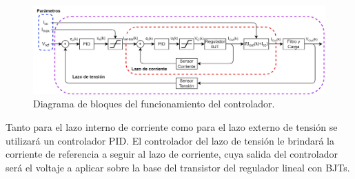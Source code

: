 \begin{figure} [H]
	\centering
	\includegraphics[width=\textwidth]{./imagenes/Esquema_Control.jpg}
	\caption{Diagrama de bloques del funcionamiento del controlador.}
	\label{F:Esquema_Control}
\end{figure} \par 
Tanto para el lazo interno de corriente como para el lazo externo de tensión se utilizará un controlador PID. El controlador del lazo de tensión le brindará la corriente de referencia a seguir al lazo de corriente, cuya salida del controlador será el voltaje a aplicar sobre la base del transistor del regulador lineal con BJTs. \par 

